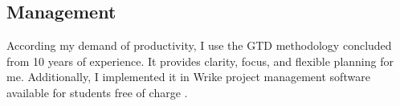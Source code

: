 		\subsection{Management}
According my demand of productivity, I use the GTD \cite{GTD} methodology concluded from 10 years of experience. It provides clarity, focus, and flexible planning for me. Additionally, I implemented it in Wrike \cite{WRIKE} project management software available for students free of charge \cite{WRIKE_for_students}.